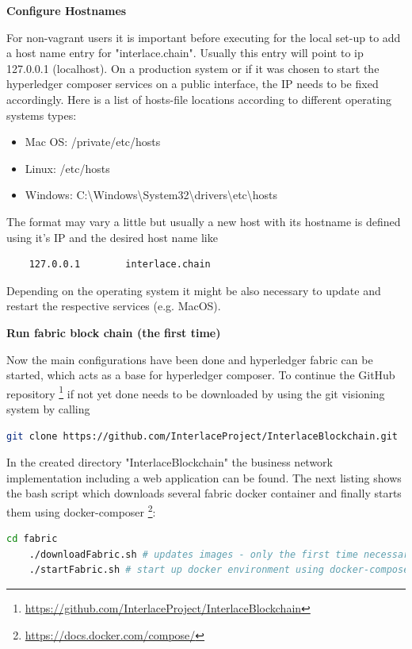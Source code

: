 \textbf{Configure Hostnames}

For non-vagrant users it is important before executing for the local set-up to add a host name entry for "interlace.chain". Usually this entry will point to ip 127.0.0.1 (localhost). On a production system or if it was chosen to start the hyperledger composer services on a public interface, the IP needs to be fixed accordingly. Here is a list of hosts-file locations according to different operating systems types:

\begin{itemize}
	\item Mac OS: /private/etc/hosts
    \item Linux: /etc/hosts
    \item Windows: C:\textbackslash Windows\textbackslash System32\textbackslash drivers\textbackslash etc\textbackslash hosts
\end{itemize}

The format may vary a little but usually a new host with its hostname is defined using it's IP and the desired host name like

\begin{lstlisting}
	127.0.0.1        interlace.chain
\end{lstlisting}

Depending on the operating system it might be also necessary to update and restart the respective services (e.g. MacOS).

\textbf{Run fabric block chain (the first time)}

Now the main configurations have been done and hyperledger fabric can be started, which acts as a base for hyperledger composer. To continue the GitHub repository \footnote{\url{https://github.com/InterlaceProject/InterlaceBlockchain}} if not yet done needs to be downloaded by using the git visioning system by calling

\begin{lstlisting}[language=bash]
	git clone https://github.com/InterlaceProject/InterlaceBlockchain.git
\end{lstlisting}

In the created directory "InterlaceBlockchain" the business network implementation including a web application can be found. The next listing shows the bash script which downloads several fabric docker container and finally starts them using docker-composer \footnote{\url{https://docs.docker.com/compose/}}:

\begin{lstlisting}[language=bash]
	cd fabric
	./downloadFabric.sh # updates images - only the first time necessary
	./startFabric.sh # start up docker environment using docker-compose
\end{lstlisting}

